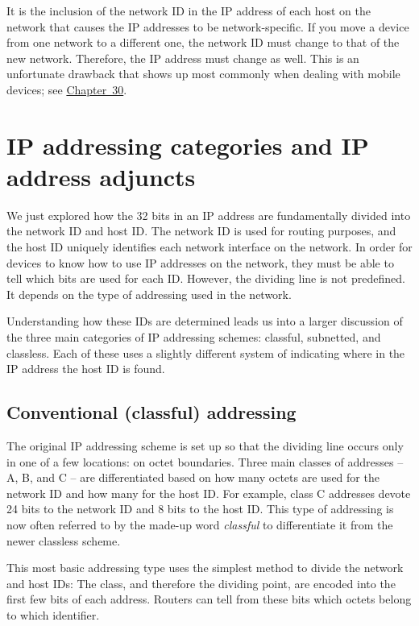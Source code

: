 \documentclass[b5paper,11pt]{memoir}
\begin{document}
It is the inclusion of the network ID in the IP address of each host on
the network that causes the IP addresses to be network-specific. If you
move a device from one network to a different one, the network ID must
change to that of the new network. Therefore, the IP address must change
as well. This is an unfortunate drawback that shows up most commonly
when dealing with mobile devices; see
\protect\hyperlink{ch30.html}{Chapter~30}.


\section{IP addressing categories and IP address adjuncts}

We just explored how the 32 bits in an IP address are fundamentally divided into
the network ID and host ID. The network ID is used for routing purposes,
and the host ID uniquely identifies each network interface on the
network. In order for devices to know how to use IP addresses on the
network, they must be able to tell which bits are used for each ID.
However, the dividing line is not predefined. It depends on the type of
addressing used in the network.

Understanding how these IDs are determined leads us into a larger
discussion of the three main categories of IP addressing schemes:
classful, subnetted, and classless. Each of these uses a slightly
different system of indicating where in the IP address the host ID is
found.



\subsection{Conventional (classful) addressing}

The original IP addressing scheme is set up so that the dividing line
occurs only in one of a few locations: on octet boundaries. Three main
classes of addresses -- A, B, and C -- are differentiated based on how
many octets are used for the network ID and how many for the host ID.
For example, class C addresses devote 24 bits to the network ID and 8
bits to the host ID. This type of addressing is now often referred to by
the made-up word {\emph{classful}} to differentiate it from the newer
classless scheme.

This most basic addressing type uses the simplest method to divide the
network and host IDs: The class, and therefore the dividing point, are
encoded into the first few bits of each address. Routers can tell from
these bits which octets belong to which identifier.
\end{document}

